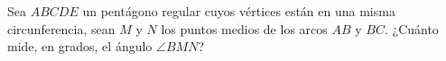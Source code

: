 Sea $ABCDE$ un pentágono regular cuyos vértices están en una misma circunferencia, sean $M$ y $N$ los puntos medios de los arcos $AB$ y $BC$. ¿Cuánto mide, en grados, el ángulo $\angle BMN$?